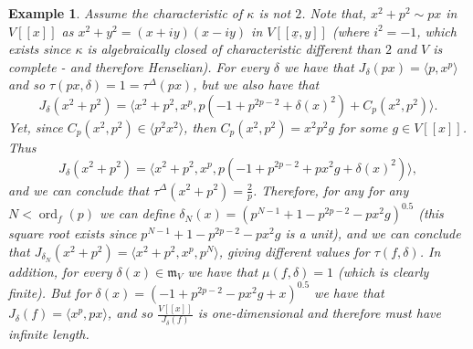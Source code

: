 \documentclass{article}
\newtheorem{example}[theorem]{Example}
\newtheorem{remark}[theorem]{Remark}
\DeclareMathOperator{\ord}{ord}
\newcommand{\maxV}{\mathfrak{m}_V}
\newcommand{\Vx}{V[[\underline{x}]]}
\newcommand{\Vxy}{V[[\underline{x},y]]}
\numberwithin{theorem}{section}
\begin{document}
\begin{example}\label{ex:delta_tjurina_A_1}
\textup{
Assume the characteristic of $\kappa$ is not $2$. Note that, $x^2 + p^2 \sim px$ in $V[[x]]$ as $x^2+y^2 = (x+iy)(x-iy)$ in $\Vxy$ (where $i^2=-1$, which exists since $\kappa$ is algebraically closed of characteristic different than $2$ and $V$ is complete - and therefore Henselian). For every $\delta$ we have that $J_\delta\left(px\right)=\langle p, x^p \rangle$ and so $\tau(px, \delta)=1= \tau^\Delta\left(px\right)$, but we also have that
%
\begin{equation*}
    J_\delta\left(x^2 + p^2\right) = \langle x^2 +p^2, x^p , p(-1 + p^{2p-2} + \delta\left(x\right)^2) + C_p\left(x^2,p^2\right) \rangle.
\end{equation*}
%
Yet, since $C_p\left(x^2,p^2\right) \in \langle p^2 x^2 \rangle$, then $C_p\left(x^2, p^2\right)=x^2p^2g$ for some $g \in V[[x]]$. Thus 
%
\begin{equation*}
    J_\delta\left(x^2 + p^2\right) = \langle x^2 +p^2, x^p , p(-1 + p^{2p-2} + px^2 g + \delta\left(x\right)^2) \rangle,
\end{equation*}
%
and we can conclude that  $\tau^\Delta\left(x^2+p^2\right)=\frac{2}{p}$. Therefore, for any for any $N <\ord_{f}\left(p\right)$ we can define $\delta_N\left(x\right)= \left(p^{N-1} + 1 - p^{2p-2} - px^2 g\right)^{0.5}$ (this square root exists since $p^{N-1} + 1 - p^{2p-2} - px^2 g$ is a unit), and we can conclude that $J_{\delta_N}\left(x^2 + p^2\right) = \langle x^2 +p^2, x^p, p^{N} \rangle$, giving different values for $\tau(f, \delta)$. In addition, for every $\delta\left(x\right) \in \maxV$ we have that $\mu(f, \delta) = 1$ (which is clearly finite). But for $\delta\left(x\right)=\left(-1+p^{2p-2}-px^2g +x\right)^{0.5}$ we have that $J_{\delta}\left(f\right)=\langle x^p, px\rangle$, and so $\frac{V[[x]]}{J_{\delta}\left(f\right)}$ is one-dimensional and therefore must have infinite length.}

\end{example}



\end{document}
